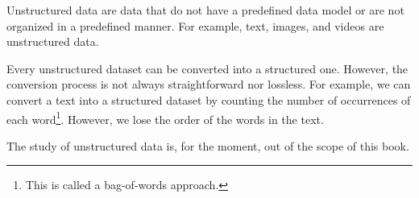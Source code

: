 Unstructured data are data that do not have a predefined data model or are not organized
in a predefined manner.  For example, text, images, and videos are unstructured data.

Every unstructured dataset can be converted into a structured one.  However, the
conversion process is not always straightforward nor lossless.  For example, we can
convert a text into a structured dataset by counting the number of occurrences of each
word\footnote{This is called a bag-of-words approach.}.
However, we lose the order of the words in the text.

The study of unstructured data is, for the moment, out of the scope of this book.

